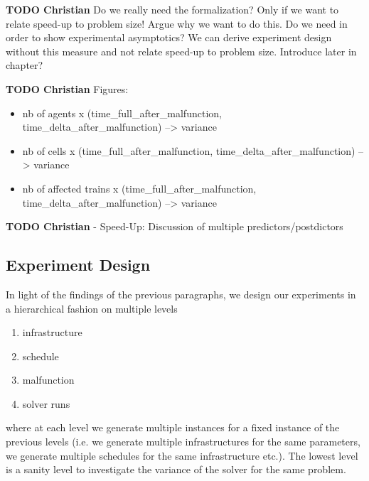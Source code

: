 \documentclass{article}
\begin{document}
\begin{mdframed}
{\bf TODO Christian} Do we really need the formalization? Only if we want to relate speed-up to problem size! Argue why we want to do this. Do we need in order to show experimental asymptotics? We can derive experiment design without this measure and not relate speed-up to problem size. Introduce later in chapter?
\end{mdframed}

\begin{mdframed}
{\bf TODO Christian} Figures:
\begin{itemize}
    \item nb of agents x (time_full_after_malfunction, time_delta_after_malfunction) --> variance
    \item nb of cells x (time_full_after_malfunction, time_delta_after_malfunction) --> variance
    \item nb of affected trains x (time_full_after_malfunction, time_delta_after_malfunction) --> variance
\end{itemize}
\end{mdframed}




\begin{mdframed}
{\bf TODO Christian} - Speed-Up: Discussion of multiple predictors/postdictors
\end{mdframed}



\subsection{Experiment Design}

In light of the findings of the previous paragraphs, we design our experiments in a hierarchical fashion on multiple levels
\begin{enumerate}
    \item infrastructure
    \item schedule
    \item malfunction
    \item solver runs
\end{enumerate}
where at each level we generate multiple instances for a fixed instance of the previous levels (i.e. we generate multiple infrastructures for the same parameters, we generate multiple schedules for the same infrastructure etc.). The lowest level is a sanity level to investigate the variance of the solver for the same problem.
\end{document}
